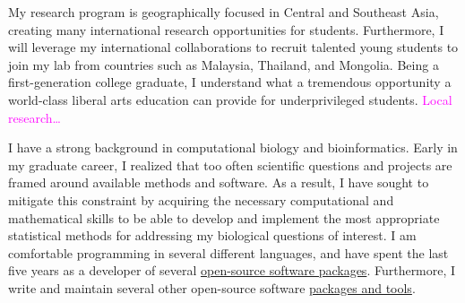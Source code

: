 \documentclass[letterpaper, 10pt]{letter}
\newcommand{\highlight}[1]{\textcolor{magenta}{#1}}
\begin{document}
\begin{letter}
My research program is geographically focused in Central and Southeast Asia,
creating many international research opportunities for students.
Furthermore, I will leverage my international collaborations to recruit
talented young students to join my lab from countries such as Malaysia,
Thailand, and Mongolia.
Being a first-generation college graduate, I understand what a tremendous
opportunity a world-class liberal arts education can provide for
underprivileged students.
\highlight{
    Local research\ldots
}


I have a strong background in computational biology and bioinformatics.
Early in my graduate career, I realized that too often scientific questions and
projects are framed around available methods and software.
As a result, I have sought to mitigate this constraint by acquiring the
necessary computational and mathematical skills to be able to develop and
implement the most appropriate statistical methods for addressing my biological
questions of interest.
I am comfortable programming in several different languages, and have spent the
last five years as a developer of several
\href{http://www.phyletica.com/?page_id=249}{open-source software packages}.
Furthermore, I write and maintain several other open-source software
\href{https://github.com/joaks1?tab=repositories}{packages and tools}.




\end{letter}
\end{document}
